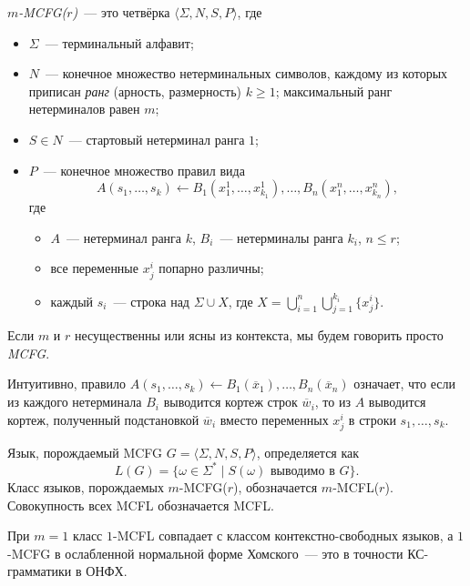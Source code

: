 \begin{definition}
    \emph{$m$-MCFG($r$)}~--- это четвёрка $\langle \Sigma, N, S, P \rangle$, где
    \begin{itemize}
        \item $\Sigma$~--- терминальный алфавит;
        \item $N$~--- конечное множество нетерминальных символов, каждому из которых приписан \emph{ранг} (арность, размерность) $k \ge 1$;
              максимальный ранг нетерминалов равен $m$;
        \item $S \in N$~--- стартовый нетерминал ранга $1$;
        \item $P$~--- конечное множество правил вида
              \[
              A(s_1,\ldots,s_k) \leftarrow B_1(x_1^1,\ldots,x_{k_1}^1), \ldots, B_n(x_1^n,\ldots,x_{k_n}^n),
              \]
              где
              \begin{itemize}
                  \item $A$~--- нетерминал ранга $k$, $B_i$~--- нетерминалы ранга $k_i$, $n \leq r$;
                  \item все переменные $x^i_j$ попарно различны;
                  \item каждый $s_i$~--- строка над $\Sigma \cup X$, где $X = \bigcup_{i=1}^n\bigcup_{j=1}^{k_i} \{x^i_j\}$.
              \end{itemize}
    \end{itemize}
    Если $m$ и $r$ несущественны или ясны из контекста, мы будем говорить просто \emph{MCFG}.
\end{definition}

Интуитивно, правило $A(s_1,\ldots,s_k) \leftarrow B_1(\overline{x}_1),\ldots,B_n(\overline{x}_n)$ означает, что если из каждого нетерминала $B_i$ выводится кортеж строк $\overline{w}_i$, то из $A$ выводится кортеж, полученный подстановкой $\overline{w}_i$ вместо переменных $x^i_j$ в строки $s_1,\ldots,s_k$.

\begin{definition}
    Язык, порождаемый MCFG $G = \langle \Sigma, N, S, P \rangle$, определяется как
    \[
    L(G) = \{ \omega \in \Sigma^* \mid S(\omega) \text{ выводимо в } G \}.
    \]
    Класс языков, порождаемых $m$-MCFG($r$), обозначается $m$-MCFL($r$).
    Совокупность всех MCFL обозначается MCFL.
\end{definition}

\begin{remark}
    При $m=1$ класс $1$-MCFL совпадает с классом контекстно-свободных языков, а $1$-MCFG в ослабленной нормальной форме Хомского~--- это в точности КС-грамматики в ОНФХ.
\end{remark}

